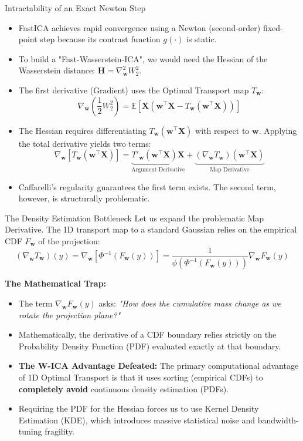 \documentclass{beamer}
\begin{document}
\begin{frame}{Intractability of an Exact Newton Step}
  \begin{itemize}
    \item FastICA achieves rapid convergence using a Newton (second-order) fixed-point step because its contrast function $g(\cdot)$ is static.
    \item To build a "Fast-Wasserstein-ICA", we would need the Hessian of the Wasserstein distance: $\mathbf{H} = \nabla^2_{\mathbf{w}} W_2^2$.
    \item The first derivative (Gradient) uses the Optimal Transport map $T_{\mathbf{w}}$:
      \[ \nabla_{\mathbf{w}} \left( \frac{1}{2} W_2^2 \right) = \mathbb{E}\left[ \mathbf{X} \left( \mathbf{w}^\top \mathbf{X} - T_{\mathbf{w}}(\mathbf{w}^\top \mathbf{X}) \right) \right] \]
    \item The Hessian requires differentiating $T_{\mathbf{w}}(\mathbf{w}^\top \mathbf{X})$ with respect to $\mathbf{w}$. Applying the total derivative yields two terms:
      \[ \nabla_{\mathbf{w}} [T_{\mathbf{w}}(\mathbf{w}^\top \mathbf{X})] = \underbrace{T'_{\mathbf{w}}(\mathbf{w}^\top \mathbf{X}) \mathbf{X}}_{\text{Argument Derivative}} + \underbrace{(\nabla_{\mathbf{w}} T_{\mathbf{w}})(\mathbf{w}^\top \mathbf{X})}_{\text{Map Derivative}} \]
    \item Caffarelli's regularity guarantees the first term exists. The second term, however, is structurally problematic.
  \end{itemize}
\end{frame}

\begin{frame}{The Density Estimation Bottleneck}
  Let us expand the problematic Map Derivative. The 1D transport map to a standard Gaussian relies on the empirical CDF $F_{\mathbf{w}}$ of the projection:
  \[ (\nabla_{\mathbf{w}} T_{\mathbf{w}})(y) = \nabla_{\mathbf{w}} \left[ \Phi^{-1}(F_{\mathbf{w}}(y)) \right] = \frac{1}{\phi(\Phi^{-1}(F_{\mathbf{w}}(y)))} \nabla_{\mathbf{w}} F_{\mathbf{w}}(y) \]
  
  \textbf{The Mathematical Trap:}
  \begin{itemize}
    \item The term $\nabla_{\mathbf{w}} F_{\mathbf{w}}(y)$ asks: \textit{"How does the cumulative mass change as we rotate the projection plane?"}
    \item Mathematically, the derivative of a CDF boundary relies strictly on the Probability Density Function (PDF) evaluated exactly at that boundary.
    \item \textbf{The W-ICA Advantage Defeated:} The primary computational advantage of 1D Optimal Transport is that it uses sorting (empirical CDFs) to \textbf{completely avoid} continuous density estimation (PDFs).
    \item Requiring the PDF for the Hessian forces us to use Kernel Density Estimation (KDE), which introduces massive statistical noise and bandwidth-tuning fragility.
  \end{itemize}
\end{frame}
\end{document}
